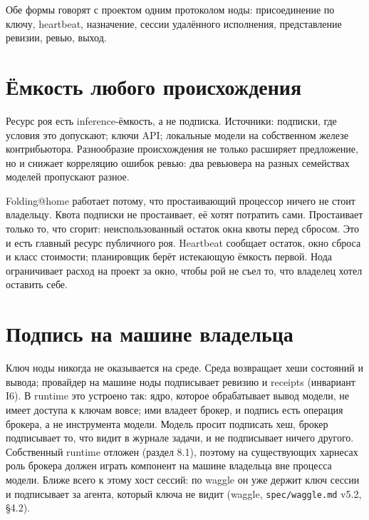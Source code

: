 Обе формы говорят с проектом одним протоколом ноды: присоединение по ключу, heartbeat, назначение, сессии удалённого исполнения, представление ревизии, ревью, выход.

\section{Ёмкость любого происхождения}

Ресурс роя есть inference-ёмкость, а не подписка. Источники: подписки, где условия это допускают; ключи API; локальные модели на собственном железе контрибьютора. Разнообразие происхождения не только расширяет предложение, но и снижает корреляцию ошибок ревью: два ревьювера на разных семействах моделей пропускают разное.

\begin{whybox}
Folding@home работает потому, что простаивающий процессор ничего не стоит владельцу. Квота подписки не простаивает, её хотят потратить сами. Простаивает только то, что сгорит: неиспользованный остаток окна квоты перед сбросом. Это и есть главный ресурс публичного роя. Heartbeat сообщает остаток, окно сброса и класс стоимости; планировщик берёт истекающую ёмкость первой. Нода ограничивает расход на проект за окно, чтобы рой не съел то, что владелец хотел оставить себе.
\end{whybox}

\section{Подпись на машине владельца}

Ключ ноды никогда не оказывается на среде. Среда возвращает хеши состояний и вывода; провайдер на машине ноды подписывает ревизию и receipts (инвариант I6). В runtime это устроено так: ядро, которое обрабатывает вывод модели, не имеет доступа к ключам вовсе; ими владеет брокер, и подпись есть операция брокера, а не инструмента модели. Модель просит подписать хеш, брокер подписывает то, что видит в журнале задачи, и не подписывает ничего другого. Собственный runtime отложен (раздел 8.1), поэтому на существующих харнесах роль брокера должен играть компонент на машине владельца вне процесса модели. Ближе всего к этому хост сессий: по waggle он уже держит ключ сессии и подписывает за агента, который ключа не видит (waggle, \texttt{spec/waggle.md} v5.2, §4.2).

